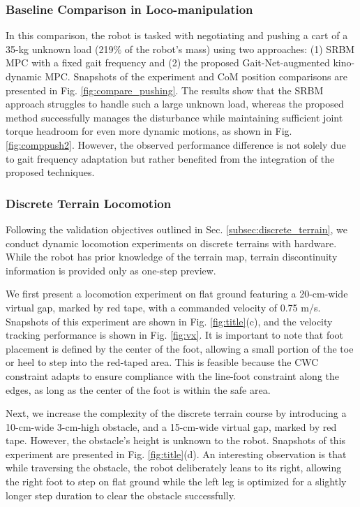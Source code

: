 \subsubsection{Baseline Comparison in Loco-manipulation}

In this comparison, the robot is tasked with negotiating and pushing a cart of a 35-kg unknown load (219$\%$ of the robot's mass) using two approaches: (1) SRBM MPC with a fixed gait frequency and (2) the proposed Gait-Net-augmented kino-dynamic MPC. Snapshots of the experiment and CoM position comparisons are presented in Fig. \ref{fig:compare_pushing}.
The results show that the SRBM approach struggles to handle such a large unknown load, whereas the proposed method successfully manages the disturbance while maintaining sufficient joint torque headroom for even more dynamic motions, as shown in Fig. \ref{fig:comppush2}. However, the observed performance difference is not solely due to gait frequency adaptation but rather benefited from the integration of the proposed techniques.


\subsubsection{Discrete Terrain Locomotion}

Following the validation objectives outlined in Sec. \ref{subsec:discrete_terrain}, we conduct dynamic locomotion experiments on discrete terrains with hardware. While the robot has prior knowledge of the terrain map, terrain discontinuity information is provided only as one-step preview.

We first present a locomotion experiment on flat ground featuring a 20-cm-wide virtual gap, marked by red tape, with a commanded velocity of 0.75 \unit{m/s}. Snapshots of this experiment are shown in Fig. \ref{fig:title}(c), and the velocity tracking performance is shown in Fig. \ref{fig:vx}. It is important to note that foot placement is defined by the center of the foot, allowing a small portion of the toe or heel to step into the red-taped area. This is feasible because the CWC constraint adapts to ensure compliance with the line-foot constraint along the edges, as long as the center of the foot is within the safe area. 

Next, we increase the complexity of the discrete terrain course by introducing a 10-cm-wide 3-cm-high obstacle, and a 15-cm-wide virtual gap, marked by red tape. However, the obstacle's height is unknown to the robot. Snapshots of this experiment are presented in Fig. \ref{fig:title}(d).
An interesting observation is that while traversing the obstacle, the robot deliberately leans to its right, allowing the right foot to step on flat ground while the left leg is optimized for a slightly longer step duration to clear the obstacle successfully.
